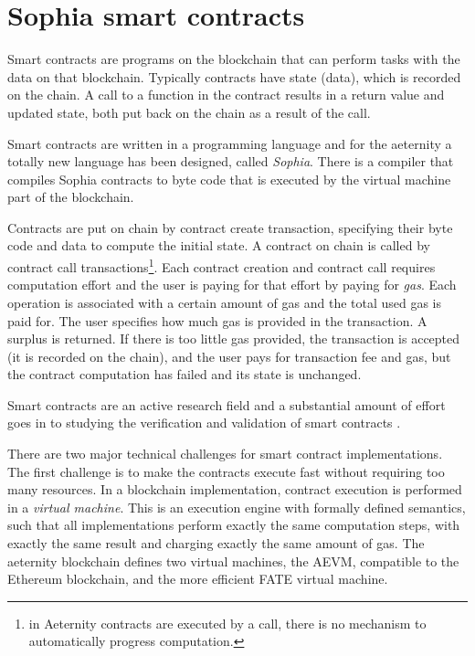 \section{Sophia smart contracts}
\label{sect:sophia}

Smart contracts \cite{szabo1996smart,hhz007} are
programs on the blockchain that can perform tasks with the data on that
blockchain. Typically contracts have state (data), which is recorded on the
chain. A call to a function in the contract results in a return value
and updated state, both put back on the chain as a result of the
call.

Smart contracts are written in a programming language and for the
aeternity a totally new language has been designed, called
\textit{Sophia}. There is a compiler that compiles Sophia contracts to
byte code that is executed by the virtual machine part of the
blockchain.

Contracts are put on chain by contract create
transaction, specifying their byte code and data to compute the
initial state. A contract on chain is called by contract call transactions\footnote{in
  Aeternity  contracts are executed by a call, there is no
  mechanism to automatically progress computation.}. Each contract
creation and contract call requires computation effort and the user is paying
for that effort by paying for \textit{gas}. Each operation is
associated with a certain amount of gas and the total used gas is paid
for. The user specifies how much gas is provided in the transaction. A
surplus is returned. If there is too little gas provided, the
transaction is accepted (it is recorded
on the chain), and the user pays for transaction fee and gas,
but the contract computation has failed and its state is unchanged.

Smart contracts are an active research field
\cite{DBLP:journals/corr/abs-1710-06372} and a substantial amount of
  effort goes in to studying the verification and validation of smart contracts
  \cite{magazzeni2017validation,bhargavan2016formal}.

There are two major technical challenges for smart contract
implementations. The first challenge is to make the contracts
execute fast without requiring too many resources. In a blockchain
implementation, contract execution is performed in a
\textit{virtual machine}. This is an execution engine with formally
defined semantics, such that all implementations perform exactly the
same computation steps, with exactly the same result and charging
exactly the same amount of gas. The aeternity blockchain defines two virtual
machines, the AEVM, compatible to the Ethereum blockchain, and the more
efficient FATE virtual machine.

